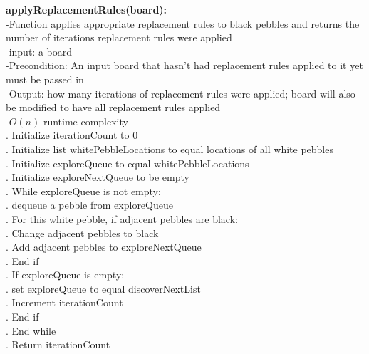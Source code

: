 \documentclass[12pt]{article}
\begin{document}
\begin{paragraph}
\indent \textbf{applyReplacementRules(board):}\\
\indent -Function applies appropriate replacement rules to black pebbles and returns the number of iterations replacement rules were applied\\
\indent -input: a board\\
\indent -Precondition: An input board that hasn't had replacement rules applied to it yet must be passed in\\
\indent -Output: how many iterations of replacement rules were applied; board will also be modified to have all replacement rules applied\\
\indent -$O(n)$ runtime complexity\\
\linebreak
\indent{}. Initialize iterationCount to 0\\
\indent{}. Initialize list whitePebbleLocations to equal locations of all white pebbles\\
\indent{}. Initialize exploreQueue to equal whitePebbleLocations\\
\indent{}. Initialize exploreNextQueue to be empty\\
\indent{}. While exploreQueue is not empty:\\
\indent\indent{}. dequeue a pebble from exploreQueue\\
\indent\indent{}. For this white pebble, if adjacent pebbles are black:\\
\indent\indent\indent{}. Change adjacent pebbles to black\\
\indent\indent\indent{}. Add adjacent pebbles to exploreNextQueue\\
\indent\indent{}. End if\\
\indent\indent{}. If exploreQueue is empty:\\
\indent\indent\indent{}. set exploreQueue to equal discoverNextList\\
\indent\indent\indent{}. Increment iterationCount\\
\indent\indent{}. End if\\
\indent{}. End while\\
\indent{}. Return iterationCount\\


\end{paragraph}
\end{document}
